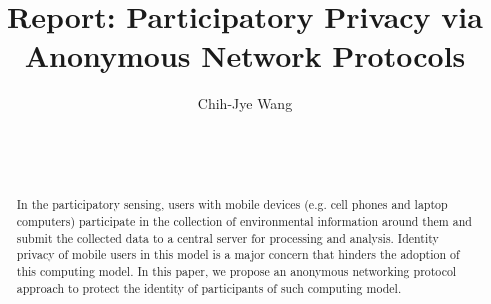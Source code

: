 \documentclass{sig-alternate}
\begin{document}
\title{Report: Participatory Privacy via Anonymous Network Protocols}



\author{
\alignauthor Chih-Jye Wang\\
      \\
      \\
     \\
}




\maketitle

\begin{abstract}
In the participatory sensing, users with mobile devices (e.g. cell phones
and laptop computers) participate in the collection of environmental
information around them and submit the collected data to a central server
for processing and analysis. Identity privacy of mobile users in this model
is a major concern that hinders the adoption of this computing model. In
this paper, we propose an anonymous networking protocol approach to protect
the identity of participants of such computing model.
\end{abstract}








%
\end{document}
